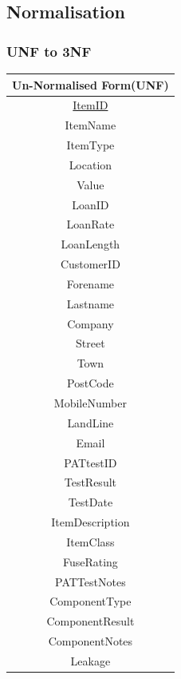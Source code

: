 \subsection{Normalisation}

\subsubsection{UNF to 3NF}

\begin{center}
    \begin{tabular}{|c|}
        \hline
        \textbf{Un-Normalised Form(UNF)}\\ \hline
        \underline{ItemID}              \\
        ItemName                        \\
        ItemType                        \\
        Location                        \\ 
        Value                           \\ 
        LoanID                          \\ 
        LoanRate                        \\ 
        LoanLength                      \\ 
        CustomerID                      \\ 
        Forename                        \\ 
        Lastname                        \\ 
        Company                         \\ 
        Street                          \\ 
        Town                            \\ 
        PostCode                        \\ 
        MobileNumber                    \\ 
        LandLine                        \\ 
        Email                           \\ 
        PATtestID                       \\
        TestResult                      \\ 
        TestDate                        \\ 
        ItemDescription                 \\ 
        ItemClass                       \\ 
        FuseRating                      \\ 
        PATTestNotes                    \\ 
        ComponentType                   \\
        ComponentResult                 \\
        ComponentNotes                  \\
        Leakage                         \\ \hline
    \end{tabular}
\end{center}

